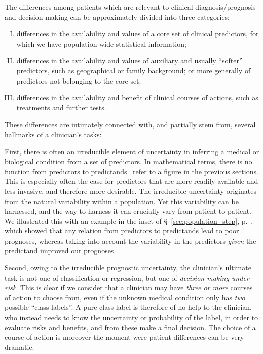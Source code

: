 \documentclass[utf8]{FrontiersinHarvard} %
\newcommand*{\pencil}{{\fontencoding{U}\fontfamily{fontawesometwo}\selectfont\symbol{210}}}
\newcommand{\mynotep}[1]{{\color{notecolour}\pencil\ #1}}
\newcommand*{\sect}{\S}%
\renewcommand*{\|}[1][]{\nonscript\:#1\vert\nonscript\:\mathopen{}}
\begin{document}
The differences among patients which are relevant to clinical diagnosis/prognosis and decision-making can be approximately divided into three categories:
\begin{enumerate}[I.]
\item\label{item:diff_corepredictors} differences in the availability and values of a core set of clinical predictors, for which we have population-wide statistical information;
\item\label{item:diff_priorinfo} differences in the availability and values of auxiliary and usually \enquote{softer} predictors, such as geographical or family background; or more generally of predictors not belonging to the core set;
\item\label{item:diff_utility} differences in the availability and benefit of clinical courses of actions, such as treatments and further tests.
\end{enumerate}

These differences are intimately connected with, and partially stem from, several hallmarks of a clinician's tasks:

First, there is often an irreducible element of uncertainty in inferring a medical or biological condition from a set of predictors. In mathematical terms, there is no function from predictors to predictands \mynotep{refer to a figure in the previous sections}. This is especially often the case for predictors that are more readily available and less invasive, and therefore more desirable. The irreducible uncertainty originates from the natural variability within a population. Yet this variability can be harnessed, and the way to harness it can crucially vary from patient to patient. We illustrated this with an example in the inset of \sect~\ref{sec:population_step}, p.~\pageref{tab:superiority_predictors_given_predictand}, which showed that any relation from predictors to predictands lead to poor prognoses, whereas taking into account the variability in the predictors \emph{given} the predictand improved our prognoses.

Second, owing to the irreducible prognostic uncertainty, the clinician's ultimate task is not one of classification or regression, but one of \emph{decision-making under risk}. This is clear if we consider that a clinician may have \emph{three or more} courses of action to choose from, even if the unknown medical condition only has \emph{two} possible \enquote{class labels}. A pure class label is therefore of no help to the clinician, who instead needs to know the uncertainty or probability of the label, in order to evaluate risks and benefits, and from these make a final decision. The choice of a course of action is moreover the moment were patient differences can be very dramatic.
\end{document}

